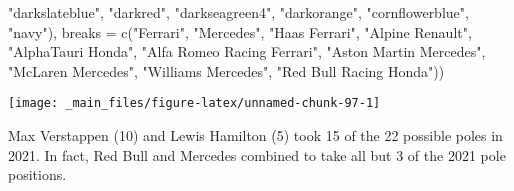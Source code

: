 \documentclass[
]{book}
\newenvironment{Shaded}{\begin{snugshade}}{\end{snugshade}}
\newcommand{\AttributeTok}[1]{\textcolor[rgb]{0.77,0.63,0.00}{#1}}
\newcommand{\FunctionTok}[1]{\textcolor[rgb]{0.00,0.00,0.00}{#1}}
\newcommand{\NormalTok}[1]{#1}
\newcommand{\StringTok}[1]{\textcolor[rgb]{0.31,0.60,0.02}{#1}}
\begin{document}
\begin{Shaded}
\begin{Highlighting}[]
                               \StringTok{"darkslateblue"}\NormalTok{, }
                                \StringTok{"darkred"}\NormalTok{,  }
                                \StringTok{"darkseagreen4"}\NormalTok{, }
                                \StringTok{"darkorange"}\NormalTok{, }
                                \StringTok{"cornflowerblue"}\NormalTok{,}
                               \StringTok{"navy"}\NormalTok{),}
                     \AttributeTok{breaks =} \FunctionTok{c}\NormalTok{(}\StringTok{"Ferrari"}\NormalTok{,}
                                 \StringTok{"Mercedes"}\NormalTok{,}
                                 \StringTok{"Haas Ferrari"}\NormalTok{,}
                                 \StringTok{"Alpine Renault"}\NormalTok{,}
                                 \StringTok{"AlphaTauri Honda"}\NormalTok{,}
                                 \StringTok{"Alfa Romeo Racing Ferrari"}\NormalTok{, }
                                 \StringTok{"Aston Martin Mercedes"}\NormalTok{,}
                                 \StringTok{"McLaren Mercedes"}\NormalTok{,}
                                 \StringTok{"Williams Mercedes"}\NormalTok{,}
                                 \StringTok{"Red Bull Racing Honda"}\NormalTok{))}
\end{Highlighting}
\end{Shaded}

\begin{center}\texttt{[image: \_main\_files/figure-latex/unnamed-chunk-97-1]} \end{center}

Max Verstappen (10) and Lewis Hamilton (5) took 15 of the 22 possible poles in 2021. In fact, Red Bull and Mercedes combined to take all but 3 of the 2021 pole positions.
\end{document}
